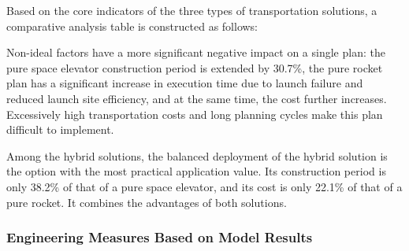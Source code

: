 Based on the core indicators of the three types of transportation solutions, a comparative analysis table is constructed as follows:
\begin{table}[htbp]
\centering
\caption{Performance and Sensitivity Comparison of Transportation Schemes}
\label{tab:scheme_performance_sensitivity}

\end{table}
\FloatBarrier

Non-ideal factors have a more significant negative impact on a single plan: the pure space elevator construction period is extended by 30.7\%, the pure rocket plan has a significant increase in execution time due to launch failure and reduced launch site efficiency, and at the same time, the cost further increases. Excessively high transportation costs and long planning cycles make this plan difficult to implement.

Among the hybrid solutions, the balanced deployment of the hybrid solution is the option with the most practical application value. Its construction period is only 38.2\% of that of a pure space elevator, and its cost is only 22.1\% of that of a pure rocket. It combines the advantages of both solutions.


\subsubsection{Engineering Measures Based on Model Results}

